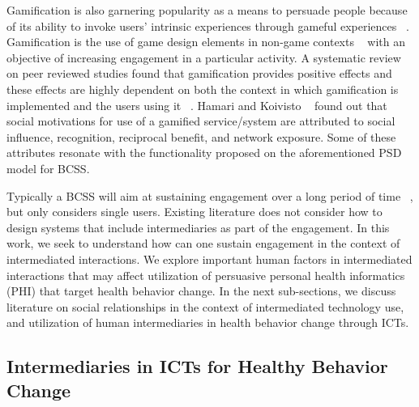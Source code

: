 \documentclass{sig-alternate}
\begin{document}
Gamification is also garnering popularity as a means to
persuade people because of its ability to invoke users' intrinsic experiences
through gameful experiences ~\cite{hamari2014persuasive}. Gamification is the
use of game design elements in non-game contexts ~\cite{deterding2011game} with
an objective of increasing engagement in a particular activity. A systematic
review on peer reviewed studies found that gamification provides positive
effects and these effects are highly dependent on both the context in which
gamification is implemented and the users using it ~\cite{hamari2014does}.
Hamari and Koivisto ~\cite{hamari2013social} found out that social motivations
for use of a gamified service/system are attributed to social influence,
recognition, reciprocal benefit, and network exposure. Some of these
attributes resonate with the functionality proposed on the aforementioned PSD
model for BCSS.

Typically a BCSS will aim at sustaining engagement over a long period of time
~\cite{Oinas-Kukkonen:foundation}, but only considers single users. 
Existing literature does not consider how to design systems that include 
intermediaries
as part of the engagement. In this work, we seek to understand how
can one sustain engagement in the context of intermediated interactions. We
explore important human factors in intermediated interactions that may affect
utilization of persuasive personal health informatics (PHI) that target health
behavior change. In the next sub-sections, we discuss literature on social
relationships in the context of intermediated technology use, and utilization
of human intermediaries in health behavior change through ICTs.

\subsection{Intermediaries in ICTs for Healthy Behavior Change}
\end{document}
